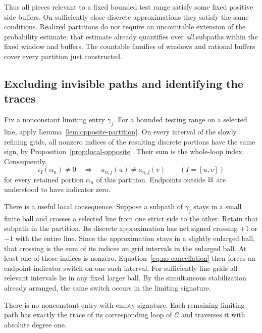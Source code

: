 Thus all pieces relevant to a fixed bounded test range satisfy some fixed positive side buffers. On sufficiently close discrete approximations they satisfy the same conditions. Realized partitions do not require an uncountable extension of the probability estimate: that estimate already quantifies over \emph{all} subpaths within the fixed window and buffers. The countable families of windows and rational buffers cover every partition just constructed.

\subsection{Excluding invisible paths and identifying the traces}

Fix a nonconstant limiting entry $\gamma_j$. For a bounded testing range on a selected line, apply Lemma~\ref{lem:opposite-partition}. On every interval of the slowly refining grids, all nonzero indices of the resulting discrete portions have the same sign, by Proposition~\ref{prop:local-opposite}. Their sum is the whole-loop index. Consequently,
\begin{equation}\label{eq:no-cancellation}
 \iota_I(\alpha_n)\ne0
 \quad\Longrightarrow\quad
 a_{n,j}(u)\ne a_{n,j}(v)
 \qquad(I=[u,v])
\end{equation}
for every retained portion $\alpha_n$ of this partition. Endpoints outside $\mathbb H$ are understood to have indicator zero.

There is a useful local consequence. Suppose a subpath of $\gamma_j$ stays in a small finite ball and crosses a selected line from one strict side to the other. Retain that subpath in the partition. Its discrete approximation has net signed crossing $+1$ or $-1$ with the entire line. Since the approximation stays in a slightly enlarged ball, that crossing is the sum of its indices on grid intervals in the enlarged ball. At least one of those indices is nonzero. Equation~\eqref{eq:no-cancellation} then forces an endpoint-indicator switch on one such interval. For sufficiently fine grids all relevant intervals lie in any fixed larger ball. By the simultaneous stabilization already arranged, the same switch occurs in the limiting signature.

\begin{lemma}\label{lem:trace-identification}
There is no nonconstant entry with empty signature. Each remaining limiting path has exactly the trace of its corresponding loop of $\mathcal C$ and traverses it with absolute degree one.
\end{lemma}

